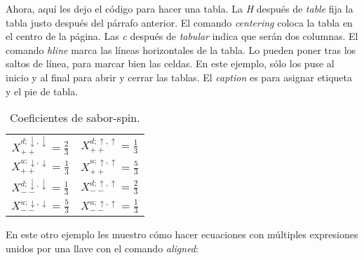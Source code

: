 \documentclass[letter,twoside,12pt]{book}
\begin{document}
Ahora, aquí les dejo el código para hacer una tabla. La \textit{H} después de \textit{table} fija la tabla justo después del párrafo anterior. El comando \textit{centering} coloca la tabla en el centro de la página. Las \textit{c} después de \textit{tabular} indica que serán dos columnas. 
El comando \textit{hline} marca las líneas horizontales de la tabla. Lo pueden poner tras los saltos de línea, para marcar bien las celdas. En este ejemplo, sólo los puse al inicio y al final para abrir y cerrar las tablas. El \textit{caption} es para asignar etiqueta y el pie de tabla.
\begin{table}[H]
\centering
\begin{tabular}{|c|c|}
\hline
$X^{d;\downarrow,\downarrow}_{++}=\frac{2}{3}$ & $X^{d;\uparrow,\uparrow}_{++}=\frac{1}{3}$\\
$X^{u;\downarrow,\downarrow}_{++}=\frac{1}{3}$ & $X^{u;\uparrow,\uparrow}_{++}=\frac{5}{3}$\\
$X^{d;\downarrow,\downarrow}_{--}=\frac{1}{3}$ & $X^{d;\uparrow,\uparrow}_{--}=\frac{2}{3}$\\
$X^{u;\downarrow,\downarrow}_{--}=\frac{5}{3}$ & $X^{u;\uparrow,\uparrow}_{--}=\frac{1}{3}$\\
\hline
\end{tabular}
\caption{Coeficientes de sabor-spin.}\label{cuadro}
\end{table} 

En este otro ejemplo les muestro cómo hacer ecuaciones con múltiples expresiones unidos por una llave con el comando \textit{aligned}:
\end{document}

